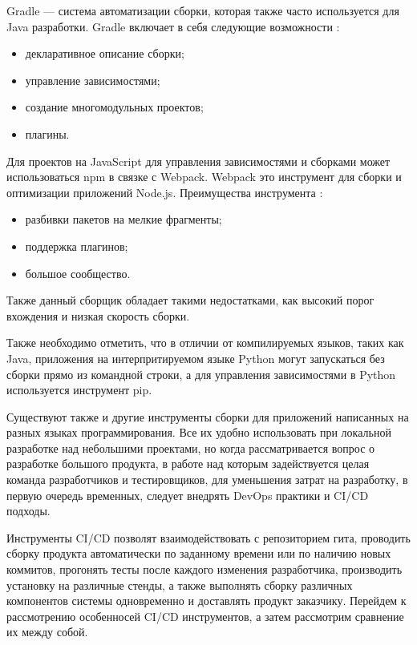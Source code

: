 Gradle — система автоматизации сборки, которая также часто используется для Java разработки. Gradle включает в себя следующие возможности \cite{gradle}:

\begin{itemize}
	\item декларативное описание сборки;
	\item управление зависимостями;
	\item создание многомодульных проектов;
	\item плагины.
\end{itemize}

Для проектов на JavaScript для управления зависимостями и сборками может использоваться npm в связке с Webpack. Webpack это инструмент для сборки и оптимизации приложений Node.js. Преимущества инструмента  \cite{webpack}:

\begin{itemize}
	\item разбивки пакетов на мелкие фрагменты;
	\item поддержка плагинов;
	\item большое сообщество.
\end{itemize}

Также данный сборщик обладает такими недостатками, как высокий порог вхождения и низкая скорость сборки.

Также необходимо отметить, что в отличии от компилируемых языков, таких как Java, приложения на интерпритируемом языке Python могут запускаться без сборки прямо из командной строки, а для управления зависимостями в Python используется инструмент pip.

Существуют также и другие инструменты сборки для приложений написанных на разных языках программирования. Все их удобно использовать при локальной разработке над небольшими проектами, но когда рассматривается вопрос о разработке большого продукта, в работе над которым задействуется целая команда разработчиков и тестировщиков, для уменьшения затрат на разработку, в первую очередь временных, следует внедрять DevOps практики и CI/CD подходы.

Инструменты CI/CD позволят взаимодействовать с репозиторием гита, проводить сборку продукта автоматически по заданному времени или по наличию новых коммитов, прогонять тесты после каждого изменения разработчика, производить установку на различные стенды, а также выполнять сборку различных компонентов системы одновременно и доставлять продукт заказчику. Перейдем к рассмотрению особенносей CI/CD инструментов, а затем рассмотрим сравнение их между собой.


